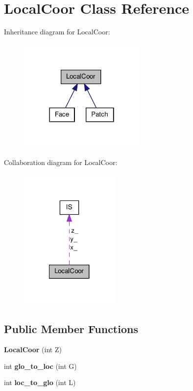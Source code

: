 \hypertarget{classLocalCoor}{\section{Local\-Coor Class Reference}
\label{classLocalCoor}
}


Inheritance diagram for Local\-Coor\-:\nopagebreak
\begin{figure}[H]
\begin{center}
\leavevmode
\includegraphics[width=178pt]{classLocalCoor__inherit__graph}
\end{center}
\end{figure}


Collaboration diagram for Local\-Coor\-:\nopagebreak
\begin{figure}[H]
\begin{center}
\leavevmode
\includegraphics[width=140pt]{classLocalCoor__coll__graph}
\end{center}
\end{figure}
\subsection*{Public Member Functions}
\begin{DoxyCompactItemize}
\item 
\hypertarget{classLocalCoor_a00f6c0c9e48e46f15e1aaf36331fedeb}{{\bfseries Local\-Coor} (int Z)}\label{classLocalCoor_a00f6c0c9e48e46f15e1aaf36331fedeb}

\item 
\hypertarget{classLocalCoor_ab96f489ba970f19b22e75f94bbec99c1}{int {\bfseries glo\-\_\-to\-\_\-loc} (int G)}\label{classLocalCoor_ab96f489ba970f19b22e75f94bbec99c1}

\item 
\hypertarget{classLocalCoor_ab5da8e4b3f6c32fbf6636aaa47e04adc}{int {\bfseries loc\-\_\-to\-\_\-glo} (int L)}\label{classLocalCoor_ab5da8e4b3f6c32fbf6636aaa47e04adc}

\end{DoxyCompactItemize}
